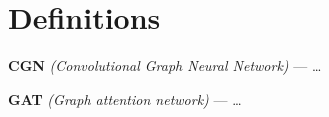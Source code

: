 \section{Definitions}

\textbf{CGN} \textit{(Convolutional Graph Neural Network)} --- \dots

\textbf{GAT} \textit{(Graph attention network)} --- \dots
